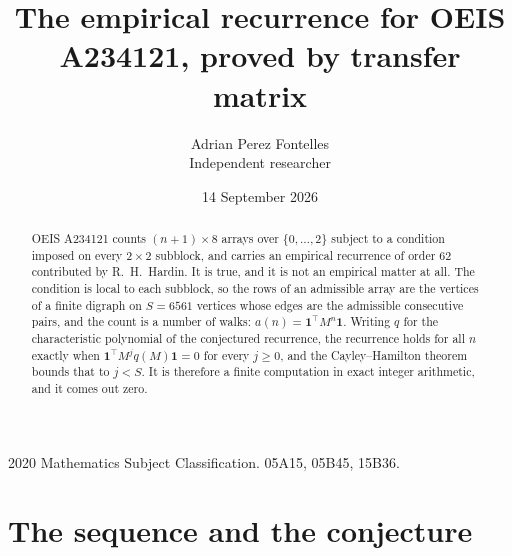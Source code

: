 \documentclass[11pt,a4paper]{article}
\title{The empirical recurrence for OEIS A234121, proved by transfer matrix}
\author{Adrian Perez Fontelles\\ \small Independent researcher}
\date{14 September 2026}
\theoremstyle{plain}
\theoremstyle{definition}
\begin{document}
\maketitle

\begin{abstract}
OEIS A234121 counts $(n+1)\times8$ arrays over $\{0,\dots,2\}$ subject to a condition imposed on
every $2\times2$ subblock, and carries an empirical recurrence of order $62$ contributed
by R.~H.~Hardin. It is true, and it is not an empirical matter at all. The condition is local
to each subblock, so the rows of an admissible array are the vertices of a finite digraph
on $S=6561$ vertices whose edges are the admissible consecutive pairs, and the count is a
number of walks: $a(n)=\mathbf{1}^{\!\top}M^{n}\mathbf{1}$. Writing $q$
for the characteristic polynomial of the conjectured recurrence, the recurrence holds for all
$n$ exactly when $\mathbf{1}^{\!\top}M^{j}q(M)\mathbf{1}=0$ for every $j\ge0$, and the
Cayley--Hamilton theorem bounds that to $j<S$. It is therefore a finite computation in exact
integer arithmetic, and it comes out zero.
\end{abstract}

\noindent\small 2020 Mathematics Subject Classification. 05A15, 05B45, 15B36.\normalsize

\section{The sequence and the conjecture}
\end{document}
